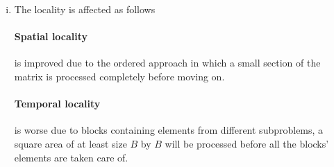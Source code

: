 \begin{enumerate}[(i)]
	\item The locality is affected as follows
\paragraph{Spatial locality} is improved due to the ordered approach in which a small section of the matrix is processed completely before moving on.
\paragraph{Temporal locality} is worse due to blocks containing elements from different subproblems, a square area of at least size $B$ by $B$ will be processed before all the blocks' elements are taken care of.
\end{enumerate}
